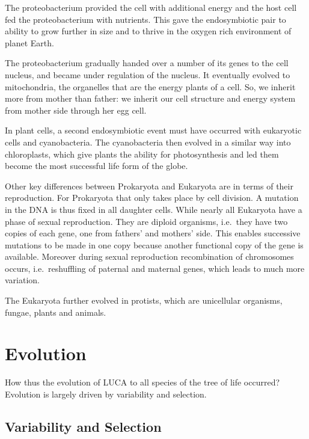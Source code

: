 \documentclass[
  11pt,
]{book}
\begin{document}
The proteobacterium provided the cell with additional energy and the host cell fed the proteobacterium with nutrients. This gave the endosymbiotic pair to ability to grow further in size and to thrive in the oxygen rich environment of planet Earth.

The proteobacterium gradually handed over a number of its genes to the cell nucleus, and became under regulation of the nucleus. It eventually evolved to mitochondria, the organelles that are the energy plants of a cell. So, we inherit more from mother than father: we inherit our cell structure and energy system from mother side through her egg cell.

In plant cells, a second endosymbiotic event must have occurred with eukaryotic cells and cyanobacteria. The cyanobacteria then evolved in a similar way into chloroplasts, which give plants the ability for photosynthesis and led them become the most successful life form of the globe.

Other key differences between Prokaryota and Eukaryota are in terms of their reproduction.
For Prokaryota that only takes place by cell division. A mutation in the DNA is thus fixed in all daughter cells. While nearly all Eukaryota have a phase of sexual reproduction. They are diploid organisms, i.e.~they have two copies of each gene, one from fathers' and mothers' side. This enables successive mutations to be made in one copy because another functional copy of the gene is available. Moreover during sexual reproduction recombination of chromosomes occurs, i.e.~reshuffling of paternal and maternal genes, which leads to much more variation.

The Eukaryota further evolved in protists, which are unicellular organisms, fungae, plants and animals.

\newpage

\hypertarget{evolution}{%
\section{Evolution}\label{evolution}}

How thus the evolution of LUCA to all species of the tree of life occurred?
Evolution is largely driven by variability and selection.

\hypertarget{variability-and-selection}{%
\subsection{Variability and Selection}\label{variability-and-selection}}
\end{document}
